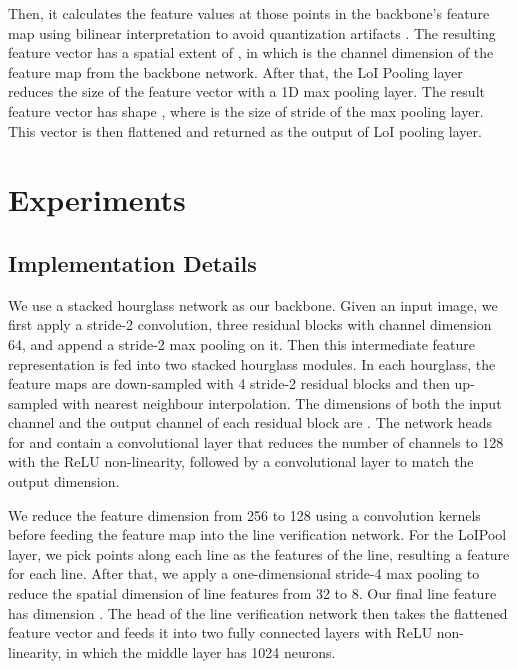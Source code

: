 \documentclass[10pt,twocolumn,letterpaper]{article}
\begin{document}
Then, it calculates the feature values at those  points in the backbone's feature map using bilinear interpretation to avoid quantization artifacts \cite{dai2016instance, jaderberg2015spatial, dai2017deformable, he2017mask}. The resulting feature vector has a spatial extent of , in which  is the channel dimension of the feature map from the backbone network.  After that, the LoI Pooling layer reduces the size of the feature vector with a 1D max pooling layer.  The result feature vector has shape , where  is the size of stride of the max pooling layer.  This vector is then flattened and returned as the output of LoI pooling layer.




\section{Experiments} \label{sec:experiments}
\subsection{Implementation Details} \label{sec:implementation}

We use a stacked hourglass network \cite{Newell:2016:Stacked} as our backbone. Given an input image, we first apply a  stride-2 convolution, three residual blocks with channel dimension 64, and append a stride-2 max pooling on it. Then this intermediate feature representation is fed into two stacked hourglass modules. In each hourglass, the feature maps are down-sampled with 4 stride-2 residual blocks and then up-sampled with nearest neighbour interpolation. The dimensions of both the input channel and the output channel of each residual block are . The network heads for  and  contain a  convolutional layer that reduces the number of channels to 128 with the ReLU non-linearity, followed by a  convolutional layer to match the output dimension. 

We reduce the feature dimension from 256 to 128 using a  convolution kernels before feeding the feature map into the line verification network. For the LoIPool layer, we pick  points along each line as the features of the line, resulting a  feature for each line. After that, we apply a one-dimensional stride-4 max pooling to reduce the spatial dimension of line features from 32 to 8. Our final line feature has dimension . The head of the line verification network then takes the flattened feature vector and feeds it into two fully connected layers with ReLU non-linearity, in which the middle layer has 1024 neurons.
\end{document}
